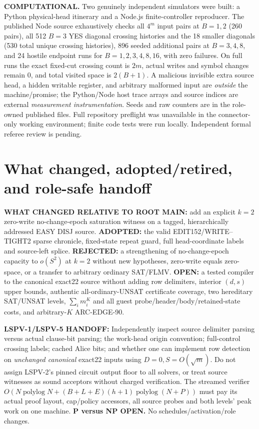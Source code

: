 \documentclass[11pt]{article}
\begin{document}
\noindent\textbf{COMPUTATIONAL.} Two genuinely independent simulators were built: a Python physical-head itinerary and a Node.js finite-controller reproducer. The published Node source exhaustively checks all \(4^m\) input pairs at \(B=1,2\) (260 pairs), all 512 \(B=3\) YES diagonal crossing histories and the 18 smaller diagonals (530 total unique crossing histories), 896 seeded additional pairs at \(B=3,4,8\), and 24 hostile endpoint runs for \(B=1,2,3,4,8,16\), with zero failures. On full runs the exact fixed-cut crossing count is \(2m\), actual writes and symbol changes remain \(0\), and total visited space is \(2(B+1)\). A malicious invisible extra source head, a hidden writable register, and arbitrary malformed input are \emph{outside} the machine/promise; the Python/Node host trace arrays and source indices are external \emph{measurement instrumentation}. Seeds and raw counters are in the role-owned published files. Full repository preflight was unavailable in the connector-only working environment; finite code tests were run locally. Independent formal referee review is pending.

\section{What changed, adopted/retired, and role-safe handoff}
\noindent\textbf{WHAT CHANGED RELATIVE TO ROOT MAIN:} add an explicit \(k=2\) zero-write no-change-epoch saturation witness on a tagged, hierarchically addressed EASY DISJ source. \textbf{ADOPTED:} the valid EDIT152/WRITE--TIGHT2 sparse chronicle, fixed-state repeat guard, full head-coordinate labels and source-left splice. \textbf{REJECTED:} a strengthening of no-change-epoch capacity to \(o(S^2)\) at \(k=2\) without new hypotheses, zero-write equals zero-space, or a transfer to arbitrary ordinary SAT/FLMV. \textbf{OPEN:} a tested compiler to the canonical exact22 source without adding row delimiters, interior \((d,s)\) upper bounds, authentic all-ordinary-UNSAT certificate coverage, two hereditary SAT/UNSAT levels, \(\sum_i m_i^K\) and all guest probe/header/body/retained-state costs, and arbitrary-\(K\) ARC-EDGE-90.

\noindent\textbf{LSPV-1/LSPV-5 HANDOFF:} Independently inspect source delimiter parsing versus actual clause-bit parsing; the work-head origin convention; full-control crossing labels; cached Alice bits; and whether one can implement row detection on \emph{unchanged canonical} exact22 inputs using \(D=0,S=O(\sqrt m)\). Do not assign LSPV-2's pinned circuit output floor to all solvers, or treat source witnesses as sound acceptors without charged verification. The streamed verifier \(O(N\operatorname{polylog} N+(B+L+E)(h+1)\operatorname{polylog}(N+P))\) must pay its actual proof layout, cap/policy accessors, all source probes and both levels' peak work on one machine. \textbf{P versus NP OPEN.} No schedules/activation/role changes.
\end{document}
